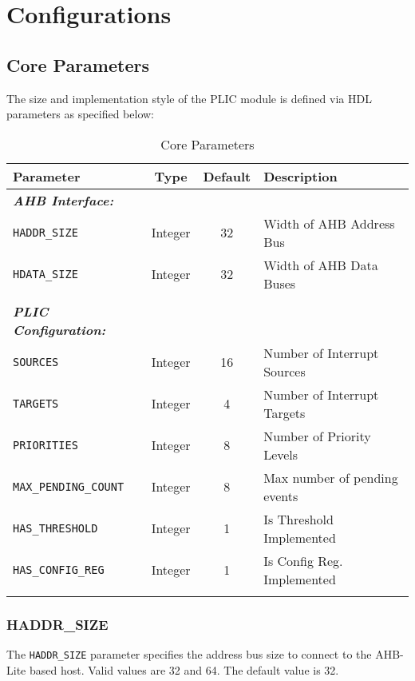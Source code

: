 \chapter{Configurations}

\hypertarget{core-parameters}{\section{Core Parameters}\label{sec:core-parameters}}

The size and implementation style of the PLIC module is defined via HDL
parameters as specified below:

\begin{longtable}[c]{@{\extracolsep{\fill}}lccl@{}}	
	\toprule 
	\textbf{Parameter}           & \textbf{Type} & \textbf{Default} & \textbf{Description}\\
	\midrule
	\endhead
	\emph{\textbf{AHB Interface:}}\\
	\texttt{HADDR\_SIZE}         & Integer & 32 & Width of AHB Address Bus\\
	\texttt{HDATA\_SIZE}         & Integer & 32 & Width of AHB Data Buses\\
	\\
	\emph{\textbf{PLIC Configuration:}}\\
	\texttt{SOURCES}             & Integer & 16 & Number of Interrupt Sources\\
	\texttt{TARGETS}             & Integer & 4 & Number of Interrupt Targets\\
	\texttt{PRIORITIES}          & Integer & 8 & Number of Priority Levels\\
	\texttt{MAX\_PENDING\_COUNT} & Integer & 8 & Max number of pending events\\
	\texttt{HAS\_THRESHOLD}      & Integer & 1 & Is Threshold Implemented\\
	\texttt{HAS\_CONFIG\_REG}    & Integer & 1 & Is Config Reg. Implemented\\
	\bottomrule 	
	\caption{Core Parameters}
	\label{tab:CoreParams}
\end{longtable}

\subsection{HADDR\_SIZE}

The \texttt{HADDR\_SIZE} parameter specifies the address bus size to
connect to the AHB-Lite based host. Valid values are 32 and 64. The
default value is 32.

